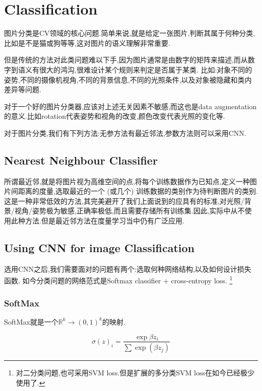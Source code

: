 \section{Classification}

图片分类是CV领域的核心问题.简单来说,就是给定一张图片,判断其属于何种分类,比如是不是猫或狗等等,这对图片的语义理解非常重要.

但是传统的方法对此类问题难以下手,因为图片通常是由数字的矩阵来描述,而从数字到语义有很大的鸿沟,很难设计某个规则来判定是否属于某类.
比如:对象不同的姿势,不同的摄像机视角,不同的背景信息,不同的光照条件,以及对象被隐藏和类内差异等问题.

对于一个好的图片分类器,应该对上述无关因素不敏感,而这也是data augmentation的意义.比如rotation代表姿势和视角的改变,颜色改变代表光照的变化等.

对于图片分类,我们有下列方法:无参方法有最近邻法,参数方法则可以采用CNN.

\subsection{Nearest Neighbour Classifier}

所谓最近邻,就是将图片视为高维空间的点,将每个训练数据作为已知点,定义一种图片间距离的度量,选取最近的一个 (或几个)
训练数据的类别作为待判断图片的类别.这是一种非常低效的方法,其完美避开了我们上面说到的应具有的标准,对光照/背景/视角/姿势极为敏感,正确率极低,而且需要存储所有训练集.因此,实际中从不使用此种方法.但是最近邻方法在度量学习当中仍有广泛应用.

\subsection{Using CNN for image Classification}

选用CNN之后,我们需要面对的问题有两个:选取何种网络结构,以及如何设计损失函数.
如今分类问题的网络范式是Softmax classifier + cross-entropy loss.
\footnote{对二分类问题,也可采用SVM loss.但是扩展的多分类SVM loss在如今已经极少使用了.}

\subsubsection{SoftMax}

SoftMax就是一个${\mathbb R}^k \to {(0, 1)}^k$的映射.

\begin{equation}
	\sigma(z)_i = \frac{\exp{\beta z_i}}{\sum \exp(\beta z_j)}
\end{equation}

